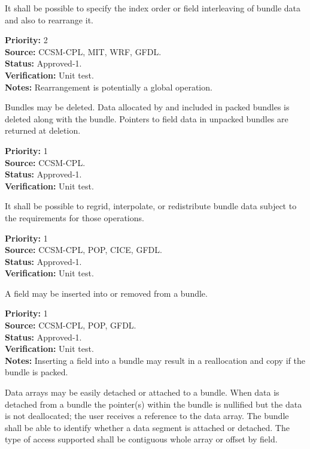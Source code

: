 It shall be possible to specify the index order or field 
interleaving of bundle data and also to rearrange it. 
\begin{reqlist}
{\bf Priority:} 2 \\
{\bf Source:} CCSM-CPL, MIT, WRF, GFDL. \\
{\bf Status:} Approved-1. \\
{\bf Verification:} Unit test. \\
{\bf Notes:} Rearrangement is potentially a global operation.
\end{reqlist}

Bundles may be deleted.  Data allocated by and included in packed bundles 
is deleted along with the bundle.  Pointers to field data in unpacked bundles
are returned at deletion.
\begin{reqlist} 
{\bf Priority:} 1\\
{\bf Source:} CCSM-CPL. \\
{\bf Status:} Approved-1. \\
{\bf Verification:} Unit test. 
\end{reqlist}


It shall be possible to regrid, interpolate, or redistribute bundle data
subject to the requirements for those operations.
\begin{reqlist}
{\bf Priority:} 1\\
{\bf Source:} CCSM-CPL, POP, CICE, GFDL. \\
{\bf Status:} Approved-1. \\
{\bf Verification:} Unit test. 
\end{reqlist}

A field may be inserted into or removed from a bundle.
\begin{reqlist}
{\bf Priority:} 1\\
{\bf Source:} CCSM-CPL, POP, GFDL. \\
{\bf Status:} Approved-1. \\
{\bf Verification:} Unit test. \\
{\bf Notes:} Inserting a field into a bundle may result in a reallocation and 
copy if the bundle is packed.  
\end{reqlist}

Data arrays may be easily detached or attached to a bundle.  When data
is detached from a bundle the pointer(s) within the bundle is nullified 
but the data is not deallocated; the user receives a reference to the data 
array.  The bundle shall be able to identify 
whether a data segment is attached or detached.  The type of access 
supported shall be contiguous whole array or offset by field.

